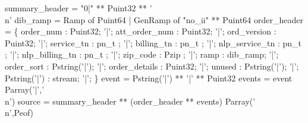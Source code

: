  summary\_header = "0|" ** Puint32 ** '\\n'
\mbox{}
 dib\_ramp = 
  Ramp of Puint64 
| GenRamp of "no\_ii" ** Puint64
\mbox{}
 order\_header = \{
       order\_num      : Puint32;
 '|';  att\_order\_num  : Puint32;             
 '|';  ord\_version    : Puint32;         
 '|';  service\_tn     : pn\_t ;
 '|';  billing\_tn     : pn\_t ;          
 '|';  nlp\_service\_tn : pn\_t ;
 '|';  nlp\_billing\_tn : pn\_t ;
 '|';  zip\_code       : Pzip ;
 '|';  ramp           : dib\_ramp; 
 '|';  order\_sort     : Pstring('|');
 '|';  order\_details  : Puint32;             
 '|';  unused         : Pstring('|');
 '|';  Pstring('|')   : stream;
 '|';
\}
\mbox{}
 event  = Pstring('|') **  '|' ** Puint32
\mbox{}
 events = event Parray('|','\\n')
\mbox{}
 source = summary\_header ** (order\_header ** events) Parray('\\n',Peof)
